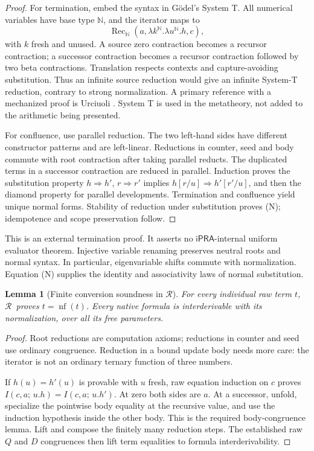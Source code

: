 \documentclass[11pt]{article}
\newtheorem{lemma}[theorem]{Lemma}
\theoremstyle{definition}
\newcommand{\ipra}{\ensuremath{\mathsf{iPRA}}}
\newcommand{\Raw}{\ensuremath{\mathcal R}}
\newcommand{\nf}[1]{\operatorname{nf}(#1)}
\newcommand{\I}[3]{I(#1,#2;\,#3)}
\begin{document}
\begin{proof}
For termination, embed the syntax in G\"odel's System T. All numerical
variables have base type $\mathbb N$, and the iterator maps to
\[
 \operatorname{Rec}_{\mathbb N}
 (a,\lambda k^{\mathbb N}.\lambda u^{\mathbb N}.h,c),
\]
with $k$ fresh and unused. A source zero contraction becomes a
recursor contraction; a successor contraction becomes a recursor
contraction followed by two beta contractions. Translation respects
contexts and capture-avoiding substitution. Thus an infinite source
reduction would give an infinite System-T reduction, contrary to
strong normalization. A primary reference with a mechanized proof is
Urciuoli \cite{urciuoli}. System T is used in the metatheory, not added
to the arithmetic being presented.

For confluence, use parallel reduction. The two left-hand sides have
different constructor patterns and are left-linear. Reductions in
counter, seed and body commute with root contraction after taking
parallel reducts. The duplicated terms in a successor contraction are
reduced in parallel. Induction proves the substitution property
$h\Rightarrow h'$, $r\Rightarrow r'$
implies $h[r/u]\Rightarrow h'[r'/u]$, and then the diamond property
for parallel developments. Termination and confluence yield unique
normal forms. Stability of reduction under substitution proves (N);
idempotence and scope preservation follow.
\end{proof}

This is an external termination proof. It asserts no \ipra-internal
uniform evaluator theorem. Injective variable renaming preserves
neutral roots and normal syntax. In particular, eigenvariable shifts
commute with normalization. Equation (N) supplies the identity and
associativity laws of normal substitution.

\begin{lemma}[Finite conversion soundness in \Raw]
For every individual raw term $t$, \Raw\ proves $t=\nf{t}$.
Every native formula is interderivable with its normalization, over
all its free parameters.
\end{lemma}

\begin{proof}
Root reductions are computation axioms; reductions in counter and seed
use ordinary congruence. Reduction in a bound update body needs more
care: the iterator is not an ordinary ternary function of three numbers.

If $h(u)=h'(u)$ is provable with $u$ fresh, raw equation induction on
$c$ proves
$\I{c}{a}{u.h}=\I{c}{a}{u.h'}$.
At zero both sides are $a$. At a successor, unfold, specialize the
pointwise body equality at the recursive value, and use the induction
hypothesis inside the other body. This is the required body-congruence
lemma. Lift and compose the finitely many reduction steps.
The established raw $Q$ and $D$ congruences then lift term equalities
to formula interderivability.
\end{proof}
\end{document}
